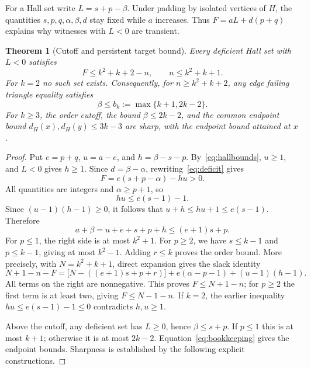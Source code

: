 \documentclass[11pt]{article}
\newtheorem{theorem}{Theorem}[section]
\theoremstyle{remark}
\begin{document}
For a Hall set write $L=s+p-\beta$. Under padding by isolated vertices of $H$, the quantities $s,p,q,\alpha,\beta,d$ stay fixed while $a$ increases. Thus $F=aL+d(p+q)$ explains why witnesses with $L<0$ are transient.

\begin{theorem}[Cutoff and persistent target bound]\label{thm:cutoff}
Every deficient Hall set with $L<0$ satisfies
\[
 F\le k^2+k+2-n,\qquad n\le k^2+k+1.
\]
For $k=2$ no such set exists.
Consequently, for $n\ge k^2+k+2$, any edge failing triangle equality satisfies
\begin{equation}\label{eq:persistent}
 \beta\le b_k:=\max\{k+1,2k-2\}.
\end{equation}
For $k\ge3$, the order cutoff, the bound $\beta\le2k-2$, and the common endpoint bound $d_H(x),d_H(y)\le3k-3$ are sharp, with the endpoint bound attained at $x$.
\end{theorem}
\begin{proof}
Put $e=p+q$, $u=a-e$, and $h=\beta-s-p$. By~\eqref{eq:hallbounds}, $u\ge1$, and $L<0$ gives $h\ge1$. Since $d=\beta-\alpha$, rewriting~\eqref{eq:deficit} gives
\[
 F=e(s+p-\alpha)-hu>0.
\]
All quantities are integers and $\alpha\ge p+1$, so
\[
 hu\le e(s-1)-1.
\]
Since $(u-1)(h-1)\ge0$, it follows that $u+h\le hu+1\le e(s-1)$. Therefore
\begin{equation}\label{eq:cutoffestimate}
 a+\beta=u+e+s+p+h\le(e+1)s+p.
\end{equation}
For $p\le1$, the right side is at most $k^2+1$. For $p\ge2$, we have $s\le k-1$ and $p\le k-1$, giving at most $k^2-1$. Adding $r\le k$ proves the order bound. More precisely, with $N=k^2+k+1$, direct expansion gives the slack identity
\begin{equation}\label{eq:slack}
 N+1-n-F=\bigl[N-((e+1)s+p+r)\bigr]
 +e(\alpha-p-1)+(u-1)(h-1).
\end{equation}
All terms on the right are nonnegative. This proves $F\le N+1-n$; for $p\ge2$ the first term is at least two, giving $F\le N-1-n$. If $k=2$, the earlier inequality $hu\le e(s-1)-1\le0$ contradicts $h,u\ge1$.

Above the cutoff, any deficient set has $L\ge0$, hence $\beta\le s+p$. If $p\le1$ this is at most $k+1$; otherwise it is at most $2k-2$. Equation~\eqref{eq:bookkeeping} gives the endpoint bounds. Sharpness is established by the following explicit constructions.
\end{proof}
\end{document}
